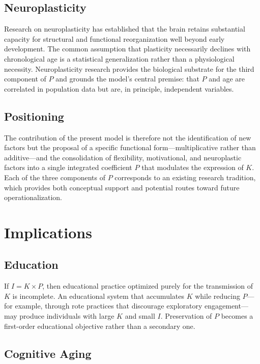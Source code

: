 \documentclass[11pt, a4paper]{article}
\begin{document}
\subsection{Neuroplasticity}

Research on neuroplasticity has established that the brain retains substantial capacity for structural and functional reorganization well beyond early development. The common assumption that plasticity necessarily declines with chronological age is a statistical generalization rather than a physiological necessity. Neuroplasticity research provides the biological substrate for the third component of $P$ and grounds the model's central premise: that $P$ and age are correlated in population data but are, in principle, independent variables.

\subsection{Positioning}

The contribution of the present model is therefore not the identification of new factors but the proposal of a specific functional form---multiplicative rather than additive---and the consolidation of flexibility, motivational, and neuroplastic factors into a single integrated coefficient $P$ that modulates the expression of $K$. Each of the three components of $P$ corresponds to an existing research tradition, which provides both conceptual support and potential routes toward future operationalization.

\section{Implications}

\subsection{Education}

If $I = K \times P$, then educational practice optimized purely for the transmission of $K$ is incomplete. An educational system that accumulates $K$ while reducing $P$---for example, through rote practices that discourage exploratory engagement---may produce individuals with large $K$ and small $I$. Preservation of $P$ becomes a first-order educational objective rather than a secondary one.

\subsection{Cognitive Aging}
\end{document}
